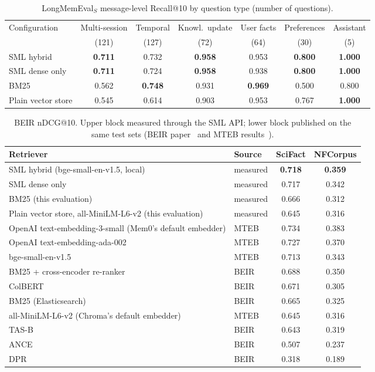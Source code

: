 \documentclass[11pt,a4paper]{article}
\theoremstyle{remark}
\newcommand{\sys}{SML}
\newcommand{\best}[1]{\textbf{#1}}
\begin{document}
\begin{table}[htbp]
\centering
\small
\caption{LongMemEval$_S$ message-level Recall@10 by question type (number of questions).}
\label{tab:lmetype}
\begin{tabular}{@{}lcccccc@{}}
\toprule
Configuration & Multi-session & Temporal & Knowl.\ update & User facts & Preferences & Assistant \\
 & (121) & (127) & (72) & (64) & (30) & (5) \\
\midrule
\sys{} hybrid & \best{0.711} & 0.732 & \best{0.958} & 0.953 & \best{0.800} & \best{1.000} \\
\sys{} dense only & \best{0.711} & 0.724 & \best{0.958} & 0.938 & \best{0.800} & \best{1.000} \\
BM25 & 0.562 & \best{0.748} & 0.931 & \best{0.969} & 0.500 & 0.800 \\
Plain vector store & 0.545 & 0.614 & 0.903 & 0.953 & 0.767 & \best{1.000} \\
\bottomrule
\end{tabular}
\end{table}

\begin{table}[htbp]
\centering
\small
\caption{BEIR nDCG@10. Upper block measured through the \sys{} API; lower block published on the same test sets (BEIR
paper~\cite{thakur2021beir} and MTEB results~\cite{muennighoff2023mteb}).}
\label{tab:beir}
\begin{tabular}{@{}llcc@{}}
\toprule
Retriever & Source & SciFact & NFCorpus \\
\midrule
\sys{} hybrid (bge-small-en-v1.5, local) & measured & \best{0.718} & \best{0.359} \\
\sys{} dense only & measured & 0.717 & 0.342 \\
BM25 (this evaluation) & measured & 0.666 & 0.312 \\
Plain vector store, all-MiniLM-L6-v2 (this evaluation) & measured & 0.645 & 0.316 \\
\midrule
OpenAI text-embedding-3-small (Mem0's default embedder) & MTEB & 0.734 & 0.383 \\
OpenAI text-embedding-ada-002 & MTEB & 0.727 & 0.370 \\
bge-small-en-v1.5 & MTEB & 0.713 & 0.343 \\
BM25 + cross-encoder re-ranker & BEIR & 0.688 & 0.350 \\
ColBERT & BEIR & 0.671 & 0.305 \\
BM25 (Elasticsearch) & BEIR & 0.665 & 0.325 \\
all-MiniLM-L6-v2 (Chroma's default embedder) & MTEB & 0.645 & 0.316 \\
TAS-B & BEIR & 0.643 & 0.319 \\
ANCE & BEIR & 0.507 & 0.237 \\
DPR & BEIR & 0.318 & 0.189 \\
\bottomrule
\end{tabular}
\end{table}
\end{document}
